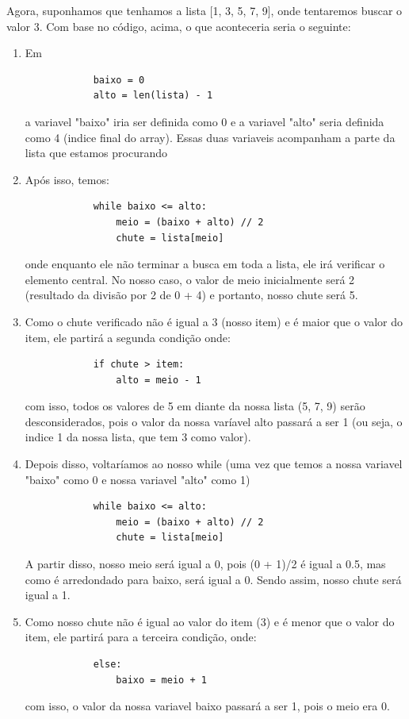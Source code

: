 \documentclass{report}
\begin{document}
	Agora, suponhamos que tenhamos a lista [1, 3, 5, 7, 9], onde tentaremos buscar o valor 3. Com base no código, acima, o que aconteceria seria o seguinte:
	
	\begin{enumerate}
		\item Em \begin{verbatim}
			baixo = 0
			alto = len(lista) - 1 
		\end{verbatim}a variavel "baixo" iria ser definida como 0 e a variavel "alto" seria definida como 4 (indice final do array). Essas duas variaveis acompanham a parte da lista que estamos procurando
		
		\item Após isso, temos: \begin{verbatim}
			while baixo <= alto:
				meio = (baixo + alto) // 2
				chute = lista[meio]
		\end{verbatim} onde enquanto ele não terminar a busca em toda a lista, ele irá verificar o elemento central. No nosso caso, o valor de meio inicialmente será 2 (resultado da divisão por 2 de 0 + 4) e portanto, nosso chute será 5.
		
		\item Como o chute verificado não é igual a 3 (nosso item) e é maior que o valor do item, ele partirá a segunda condição onde: \begin{verbatim}
			if chute > item:
				alto = meio - 1
		\end{verbatim}
		com isso, todos os valores de 5 em diante da nossa lista (5, 7, 9) serão desconsiderados, pois o valor da nossa varíavel alto passará a ser 1 (ou seja, o indice 1 da nossa lista, que tem 3 como valor). 
		
		\item Depois disso, voltaríamos ao nosso while (uma vez que temos a nossa variavel "baixo" como 0 e nossa variavel "alto" como 1)\begin{verbatim}
			while baixo <= alto:
				meio = (baixo + alto) // 2
				chute = lista[meio]
		\end{verbatim} A partir disso, nosso meio será igual a 0, pois (0 + 1)/2 é igual a 0.5, mas como é arredondado para baixo, será igual a 0. Sendo assim, nosso chute será igual a 1.
		
		\item Como nosso chute não é igual ao valor do item (3) e é menor que o valor do item, ele partirá para a terceira condição, onde:\begin{verbatim}
			else:
				baixo = meio + 1
		\end{verbatim} com isso, o valor da nossa variavel baixo passará a ser 1, pois o meio era 0.
		

\end{enumerate}
\end{document}
